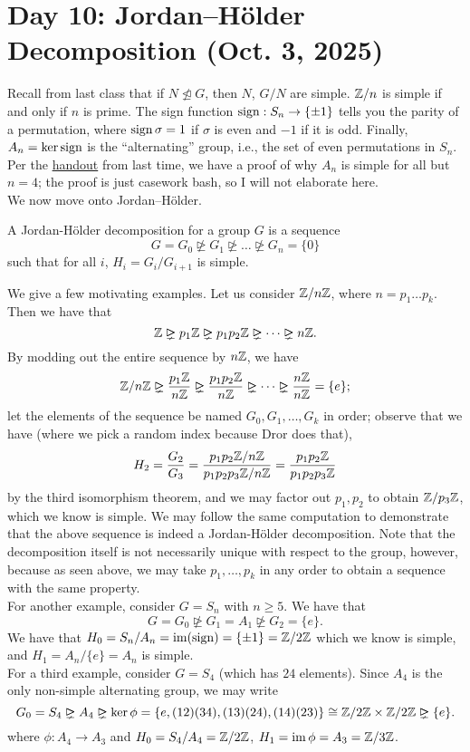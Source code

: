 \section{Day 10: Jordan--H\"older Decomposition (Oct. 3, 2025)}
Recall from last class that if $N \nunlhd G$, then $N$, $G/N$ are simple. $\mathbb Z/n$ is simple if and only if $n$ is prime. The sign function $\operatorname{sign} : S_n \to \{\pm 1\}$ tells you the parity of a permutation, where $\operatorname{sign} \sigma = 1$ if $\sigma$ is even and $-1$ if it is odd. Finally, $A_n = \ker \operatorname{sign}$ is the ``alternating'' group, i.e., the set of even permutations in $S_n$.
\\[8pt]
Per the \href{https://drorbn.net/AcademicPensieve/Classes/25-347-GroupsRingsFields/SimplicityOfAn.pdf}{handout} from last time, we have a proof of why $A_n$ is simple for all but $n = 4$; the proof is just casework bash, so I will not elaborate here. %
\\[8pt]
We now move onto Jordan--H\"older.
\begin{definition}
    A Jordan-H\"older decomposition for a group $G$ is a sequence
    \[ G = G_0 \nunrhd G_1 \nunrhd \dots \nunrhd G_n = \{0\} \]
    such that for all $i$, $H_i = G_i/G_{i+1}$ is simple.
\end{definition}
\noindent We give a few motivating examples. Let us consider $\mathbb Z/n\mathbb Z$, where $n = p_1 \dots p_k$. Then we have that
\[ \ZZ \nunrhd p_1 \ZZ \nunrhd p_1 p_2 \ZZ \nunrhd \dots \nunrhd n \ZZ. \]
By modding out the entire sequence by $n\mathbb Z$, we have
\[ \ZZ/n\ZZ \nunrhd \frac{p_1 \ZZ}{n\ZZ} \nunrhd \frac{p_1p_2 \ZZ}{n\ZZ} \nunrhd \dots \nunrhd \frac{n\ZZ}{n\ZZ} = \{e\}; \]
let the elements of the sequence be named $G_0, G_1, \dots, G_k$ in order; observe that we have (where we pick a random index because Dror does that),
\[ H_2 = \frac{G_2}{G_3} = \frac{p_1p_2 \mathbb Z / n\mathbb Z}{p_1p_2p_3 \mathbb Z / n\mathbb Z} = \frac{p_1p_2 \mathbb Z}{p_1p_2p_3 \mathbb Z} \]
by the third isomorphism theorem, and we may factor out $p_1, p_2$ to obtain $\mathbb Z/p_3\mathbb Z$, which we know is simple. We may follow the same computation to demonstrate that the above sequence is indeed a Jordan-H\"older decomposition. Note that the decomposition itself is not necessarily unique with respect to the group, however, because as seen above, we may take $p_1, \dots, p_k$ in any order to obtain a sequence with the same property.
\\[8pt]
For another example, consider $G = S_n$ with $n \geq 5$. We have that
\[ G = G_0 \nunrhd G_1 = A_1 \nunrhd G_2 = \{e\}. \]
We have that $H_0 = S_n/A_n = \operatorname{im}(\operatorname{sign}) = \{\pm 1\} = \mathbb Z/2\mathbb Z$ which we know is simple, and $H_1 = A_n/\{e\} = A_n$ is simple.
\\[8pt]
For a third example, consider $G = S_4$ (which has $24$ elements). Since $A_4$ is the only non-simple alternating group, we may write
\[ G_0 = S_4 \nunrhd A_4 \nunrhd \ker \phi = \{e, (12)(34), (13)(24), (14)(23)\} \cong \ZZ/2\ZZ \times \ZZ/2\ZZ \nunrhd \{e\}. \]
where $\phi : A_4 \to A_3$ and $H_0 = S_4/A_4 = \mathbb Z/2\mathbb Z$, $H_1 = \operatorname{im} \phi = A_3 = \mathbb Z/3\mathbb Z$. %